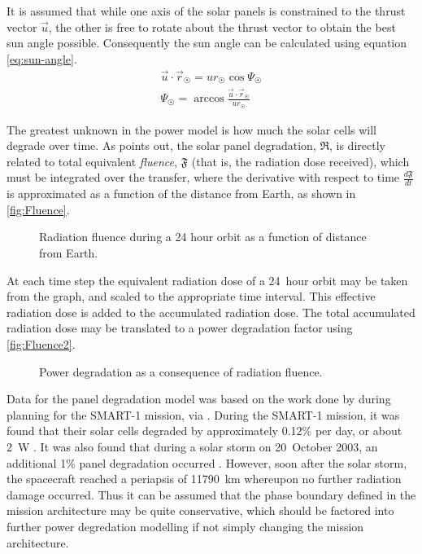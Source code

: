 It is assumed that while one axis of the solar panels is constrained to the thrust vector $\vec{u}$, the other is free to rotate about the thrust vector to obtain the best sun angle possible. Consequently the sun angle can be calculated using equation \eqref{eq:sun-angle}.
\begin{subequations}
\begin{gather} \label{eq:sun-angle}
\vec{u}\cdot\vec{r}_\Sun = ur_\Sun\cos\Psi_\Sun \\
\Psi_\Sun = \arccos\frac{\vec{u}\cdot\vec{r}_\Sun}{ur_\Sun}
\end{gather}
\end{subequations}

The greatest unknown in the power model is how much the solar cells will degrade over time. As \textcite{Erb_thesis} points out, the solar panel degradation, $\mathfrak{R}$, is directly related to total equivalent \emph{fluence}, $\mathfrak{F}$ (that is, the radiation dose received), which must be integrated over the transfer, where the derivative with respect to time $\frac{d\mathfrak{F}}{dt}$ is approximated as a function of the distance from Earth, as shown in \autoref{fig:Fluence}. 

\begin{figure}
\centering
\def\svgwidth{\figurewidth}

\caption{Radiation fluence during a 24 hour orbit as a function of distance from Earth.} \label{fig:Fluence}
\end{figure}
  
At each time step the equivalent radiation dose of a 24~hour orbit may be taken from the graph, and scaled to the appropriate time interval. This effective radiation dose is added to the accumulated radiation dose. The total accumulated radiation dose may be translated to a power degradation factor using \autoref{fig:Fluence2}.

\begin{figure}
\centering
\def\svgwidth{\figurewidth}

\caption{Power degradation as a consequence of radiation fluence.} \label{fig:Fluence2}
\end{figure}

Data for the panel degradation model was based on the work done by \textcite{Hechler2002} during planning for the SMART-1 mission, via \textcite{Erb_thesis}. During the SMART-1 mission, it was found that their solar cells degraded by approximately 0.12\% per day, or about 2~W \parencite{Racca5}. It was also found that during a solar storm on 20~October 2003, an additional 1\% panel degradation occurred \parencite{Racca8}. However, soon after the solar storm, the spacecraft reached a periapsis of 11790~km whereupon no further radiation damage occurred. Thus it can be assumed that the phase boundary defined in the mission architecture may be quite conservative, which should be factored into further power degredation modelling if not simply changing the mission architecture.

